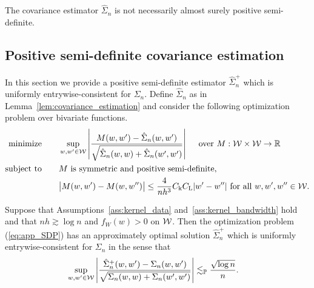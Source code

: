 \begin{remark}

  The covariance estimator $\hat \Sigma_n$
  is not necessarily almost surely positive semi-definite.

\end{remark}

\subsection{Positive semi-definite covariance estimation}
\label{sec:PSD}

In this section we provide a
positive semi-definite estimator $\hat \Sigma_n^+$
which is uniformly entrywise-consistent for $\Sigma_n$.
Define $\hat \Sigma_n$ as in
Lemma~\ref{lem:covariance_estimation}
and consider the following optimization problem
over bivariate functions.
\begin{equation}
  \label{eq:app_SDP}
  \begin{aligned}
    \operatorname*{minimize}
    \qquad
     & \sup_{w,w' \in \mathcal{W}}
    \left|
    \frac{M(w,w') - \hat\Sigma_n(w,w')}
    {\sqrt{\hat \Sigma_n(w,w) + \hat \Sigma_n(w',w')}}
    \right|
    \quad \textup{ over } M: \mathcal{W} \times \mathcal{W} \to \mathbb{R}
    \\
    \operatorname*{subject\ to}
    \qquad
     & M \textup{ is symmetric and positive semi-definite}, \\
     & \big|M(w,w') - M(w, w'')\big|
    \leq \frac{4}{nh^3}
    C_\mathrm{k} C_\mathrm{L}
    |w'-w''|
    \textup{ for all }
    w, w', w'' \in \mathcal{W}.
  \end{aligned}
\end{equation}

\begin{lemma}
  \label{lem:app_SDP}

  Suppose that Assumptions~\ref{ass:kernel_data}
  and~\ref{ass:kernel_bandwidth} hold and that
  $nh \gtrsim \log n$ and $f_W(w) > 0$ on $\mathcal{W}$.
  Then the optimization problem (\ref{eq:app_SDP})
  has an approximately optimal solution $\hat\Sigma_n^+$
  which is uniformly entrywise-consistent
  for $\Sigma_n$ in the sense that
  \begin{align*}
    \sup_{w,w' \in \mathcal{W}}
    \left|
    \frac{\hat \Sigma_n^+(w,w') - \Sigma_n(w,w')}
    {\sqrt{\Sigma_n(w,w) + \Sigma_n(w',w')}}
    \right|
    &\lesssim_{\mathbb{P}}
    \frac{\sqrt{\log n}}{n}.
  \end{align*}

\end{lemma}

